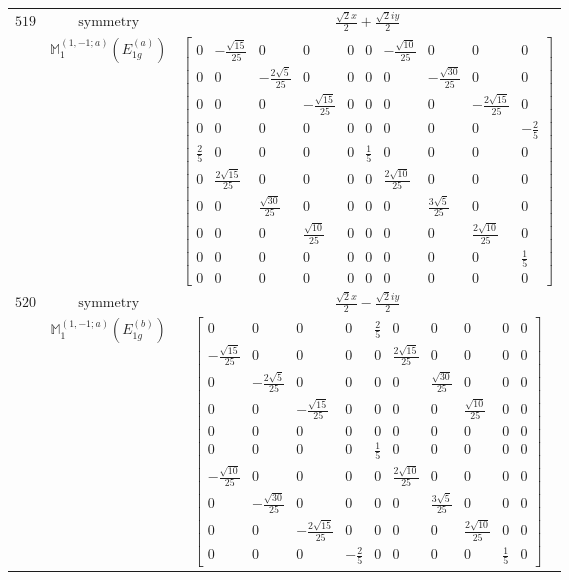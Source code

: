 \documentclass[fleqn,8pt,landscape]{jsarticle}
\begin{document}
\begin{longtable}{ccc}
$ 519 $ & $ \text{symmetry} $ & $ \frac{\sqrt{2} x}{2} + \frac{\sqrt{2} i y}{2} $ \\
$  $ & $ \mathbb{M}_{1}^{(1,-1;a)}(E_{1g}^{(a)}) $ & $ \begin{bmatrix} 0 & - \frac{\sqrt{15}}{25} & 0 & 0 & 0 & 0 & - \frac{\sqrt{10}}{25} & 0 & 0 & 0 \\ 0 & 0 & - \frac{2 \sqrt{5}}{25} & 0 & 0 & 0 & 0 & - \frac{\sqrt{30}}{25} & 0 & 0 \\ 0 & 0 & 0 & - \frac{\sqrt{15}}{25} & 0 & 0 & 0 & 0 & - \frac{2 \sqrt{15}}{25} & 0 \\ 0 & 0 & 0 & 0 & 0 & 0 & 0 & 0 & 0 & - \frac{2}{5} \\ \frac{2}{5} & 0 & 0 & 0 & 0 & \frac{1}{5} & 0 & 0 & 0 & 0 \\ 0 & \frac{2 \sqrt{15}}{25} & 0 & 0 & 0 & 0 & \frac{2 \sqrt{10}}{25} & 0 & 0 & 0 \\ 0 & 0 & \frac{\sqrt{30}}{25} & 0 & 0 & 0 & 0 & \frac{3 \sqrt{5}}{25} & 0 & 0 \\ 0 & 0 & 0 & \frac{\sqrt{10}}{25} & 0 & 0 & 0 & 0 & \frac{2 \sqrt{10}}{25} & 0 \\ 0 & 0 & 0 & 0 & 0 & 0 & 0 & 0 & 0 & \frac{1}{5} \\ 0 & 0 & 0 & 0 & 0 & 0 & 0 & 0 & 0 & 0 \end{bmatrix} $ \\ \hline
$ 520 $ & $ \text{symmetry} $ & $ \frac{\sqrt{2} x}{2} - \frac{\sqrt{2} i y}{2} $ \\
$  $ & $ \mathbb{M}_{1}^{(1,-1;a)}(E_{1g}^{(b)}) $ & $ \begin{bmatrix} 0 & 0 & 0 & 0 & \frac{2}{5} & 0 & 0 & 0 & 0 & 0 \\ - \frac{\sqrt{15}}{25} & 0 & 0 & 0 & 0 & \frac{2 \sqrt{15}}{25} & 0 & 0 & 0 & 0 \\ 0 & - \frac{2 \sqrt{5}}{25} & 0 & 0 & 0 & 0 & \frac{\sqrt{30}}{25} & 0 & 0 & 0 \\ 0 & 0 & - \frac{\sqrt{15}}{25} & 0 & 0 & 0 & 0 & \frac{\sqrt{10}}{25} & 0 & 0 \\ 0 & 0 & 0 & 0 & 0 & 0 & 0 & 0 & 0 & 0 \\ 0 & 0 & 0 & 0 & \frac{1}{5} & 0 & 0 & 0 & 0 & 0 \\ - \frac{\sqrt{10}}{25} & 0 & 0 & 0 & 0 & \frac{2 \sqrt{10}}{25} & 0 & 0 & 0 & 0 \\ 0 & - \frac{\sqrt{30}}{25} & 0 & 0 & 0 & 0 & \frac{3 \sqrt{5}}{25} & 0 & 0 & 0 \\ 0 & 0 & - \frac{2 \sqrt{15}}{25} & 0 & 0 & 0 & 0 & \frac{2 \sqrt{10}}{25} & 0 & 0 \\ 0 & 0 & 0 & - \frac{2}{5} & 0 & 0 & 0 & 0 & \frac{1}{5} & 0 \end{bmatrix} $ \\ \hline

\end{longtable}
\end{document}
